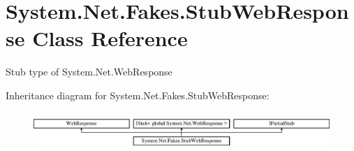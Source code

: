 \hypertarget{class_system_1_1_net_1_1_fakes_1_1_stub_web_response}{\section{System.\-Net.\-Fakes.\-Stub\-Web\-Response Class Reference}
\label{class_system_1_1_net_1_1_fakes_1_1_stub_web_response}
}


Stub type of System.\-Net.\-Web\-Response 


Inheritance diagram for System.\-Net.\-Fakes.\-Stub\-Web\-Response\-:\begin{figure}[H]
\begin{center}
\leavevmode
\includegraphics[height=1.452659cm]{class_system_1_1_net_1_1_fakes_1_1_stub_web_response}
\end{center}
\end{figure}
